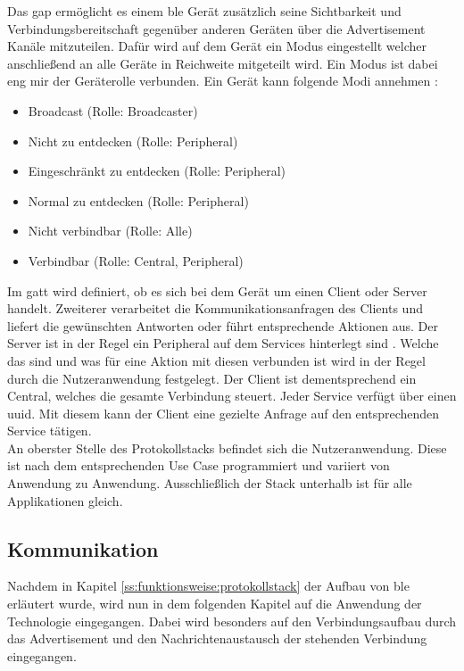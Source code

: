 \noindent Das \ac{gap} ermöglicht es einem \ac{ble} Gerät zusätzlich seine Sichtbarkeit und Verbindungsbereitschaft gegenüber anderen Geräten über die Advertisement Kanäle mitzuteilen. Dafür wird auf dem Gerät ein Modus eingestellt welcher anschließend an alle Geräte in Reichweite mitgeteilt wird. Ein Modus ist dabei eng mir der Geräterolle verbunden. Ein Gerät kann folgende Modi annehmen \cite[Seite 35]{Townsend14:GSB}:
\begin{itemize}
	\item{Broadcast (Rolle: Broadcaster)}
	\item{Nicht zu entdecken (Rolle: Peripheral)}
	\item{Eingeschränkt zu entdecken (Rolle: Peripheral)}
	\item{Normal zu entdecken (Rolle: Peripheral)}
	\item{Nicht verbindbar (Rolle: Alle)}
	\item{Verbindbar (Rolle: Central, Peripheral)}
\end{itemize}   

\noindent Im \ac{gatt} wird definiert, ob es sich bei dem Gerät um einen Client oder Server handelt. Zweiterer verarbeitet die Kommunikationsanfragen des Clients und liefert die gewünschten Antworten oder führt entsprechende Aktionen aus. Der Server ist in der Regel ein Peripheral auf dem Services hinterlegt sind \cite[Seite 30]{Usama17:BBS}. Welche das sind und was für eine Aktion mit diesen verbunden ist wird in der Regel durch die Nutzeranwendung festgelegt. Der Client ist dementsprechend ein Central, welches die gesamte Verbindung steuert. Jeder Service verfügt über einen \ac{uuid}. Mit diesem kann der Client eine gezielte Anfrage auf den entsprechenden Service tätigen.\\    

\noindent An oberster Stelle des Protokollstacks befindet sich die Nutzeranwendung. Diese ist nach dem entsprechenden Use Case programmiert und variiert von Anwendung zu Anwendung. Ausschließlich der Stack unterhalb ist für alle Applikationen gleich.\\

\subsection{Kommunikation}
\label{ss:funktionsweise:kommunkation}

\noindent Nachdem in Kapitel \ref{ss:funktionsweise:protokollstack} der Aufbau von \ac{ble} erläutert wurde, wird nun in dem folgenden Kapitel auf die Anwendung der Technologie eingegangen. Dabei wird besonders auf den Verbindungsaufbau durch das Advertisement und den Nachrichtenaustausch der stehenden Verbindung eingegangen.\\

